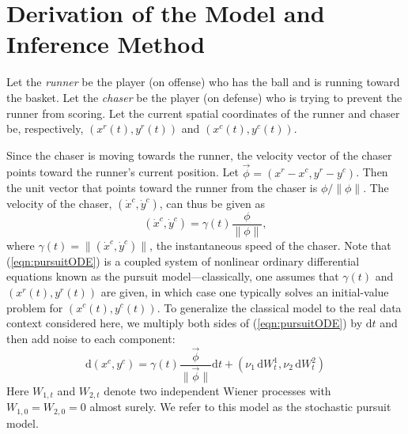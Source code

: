 \documentclass[graybox]{svmult}
\begin{document}
\section{Derivation of the Model and Inference Method}
\label{sec:2}
Let the \emph{runner} be the player (on offense) who has the ball and
is running toward the basket.  Let the \emph{chaser} be the player (on
defense) who is trying to prevent the runner from scoring. Let the
current spatial coordinates of the runner and chaser be, respectively,
$(x^{r}(t), y^{r}(t))$ and $(x^{c}(t), y^{c}(t))$.


Since the chaser is moving towards the runner, the velocity vector of the chaser
points toward the runner's current position.  Let $\vec{\phi} = (x^{r}
- x^{c}, y^{r} - y^{c})$. Then the unit vector that points toward the
runner from the chaser is $\phi / \| \phi \|$.  The velocity of the chaser, $(\dot{x}^c, \dot{y}^c)$, can thus be given as
\begin{equation}
\label{eqn:pursuitODE}
(\dot{x}^c, \dot{y}^c) = \gamma(t) \frac{\phi}{\| \phi \|},
\end{equation}
where $\gamma(t) = \| (\dot{x}^c,\dot{y}^c) \|$, the instantaneous
speed of the chaser.  Note that (\ref{eqn:pursuitODE}) is a coupled
system of nonlinear ordinary differential equations known as the
pursuit model---classically, one assumes that
$\gamma(t)$ and $(x^{r}(t),y^{r}(t))$ are given, in which case one
typically solves an initial-value problem for $(x^{c}(t),y^{c}(t))$.
To generalize the classical model to the real data context considered
here, we multiply both sides of (\ref{eqn:pursuitODE}) by $\mathrm{d}t$ and
then add noise to each component:
\begin{equation}
\label{eqn:pursuitSDE}
\mathrm{d}(x^{c}, y^{c}) = \gamma(t) \frac{\vec{\phi}}{ \|
                           \vec{\phi} \| } \mathrm{d}t + (\nu_1 \,
                         \mathrm{d}W^1_t, \nu_2 \, \mathrm{d}W^2_t)
\end{equation}
Here $W_{1,t}$ and $W_{2,t}$ denote two independent Wiener processes
with $W_{1,0} = W_{2,0} = 0$ almost surely.  We refer to this model as
the stochastic pursuit model.
\end{document}
